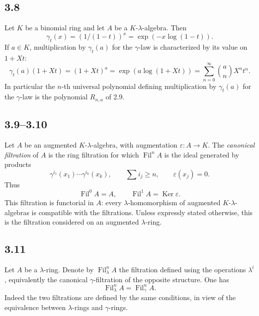 \documentclass[11pt]{article}
\theoremstyle{plain}
\theoremstyle{definition}
\theoremstyle{remark}
\DeclareMathOperator{\Ker}{Ker}
\providecommand{\Fil}{\operatorname{Fil}}
\begin{document}
\subsection*{3.8}
Let $K$ be a binomial ring and let $A$ be a $K$-$\lambda$-algebra. Then
\begin{equation}\label{eq:3.8}
\gamma_t(x)=(1/(1-t))^x=\exp(-x\log(1-t)).
\end{equation}
If $a\in K$, multiplication by $\gamma_t(a)$ for the $\gamma$-law is characterized by its value on $1+Xt$:
\begin{equation}\label{eq:3.8.1}
\gamma_t(a)(1+Xt)=(1+Xt)^a=\exp(a\log(1+Xt))=\sum_{n=0}^{\infty}\binom{a}{n}X^nt^n.
\end{equation}
In particular the $n$-th universal polynomial defining multiplication by $\gamma_t(a)$ for the $\gamma$-law is the polynomial $R_{n,a}$ of 2.9.

\subsection*{3.9--3.10}
Let $A$ be an augmented $K$-$\lambda$-algebra, with augmentation $\varepsilon:A\to K$. The \emph{canonical filtration} of $A$ is the ring filtration for which $\Fil^nA$ is the ideal generated by products
\begin{equation}\label{eq:3.10}
\gamma^{i_1}(x_1)\cdots\gamma^{i_k}(x_k),
\qquad
\sum i_j\geq n,
\qquad
\varepsilon(x_j)=0.
\end{equation}
Thus
\begin{equation}\label{eq:3.10.1}
\Fil^0A=A,
\qquad
\Fil^1A=\Ker\varepsilon.
\end{equation}
This filtration is functorial in $A$: every $\lambda$-homomorphism of augmented $K$-$\lambda$-algebras is compatible with the filtrations. Unless expressly stated otherwise, this is the filtration considered on an augmented $\lambda$-ring.

\subsection*{3.11}
Let $A$ be a $\lambda$-ring. Denote by $\Fil^n_\lambda A$ the filtration defined using the operations $\lambda^i$, equivalently the canonical $\gamma$-filtration of the opposite structure. One has
\begin{equation}\label{eq:3.11}
\Fil^n_\lambda A=\Fil^n_\gamma A.
\end{equation}
Indeed the two filtrations are defined by the same conditions, in view of the equivalence between $\lambda$-rings and $\gamma$-rings.
\end{document}
